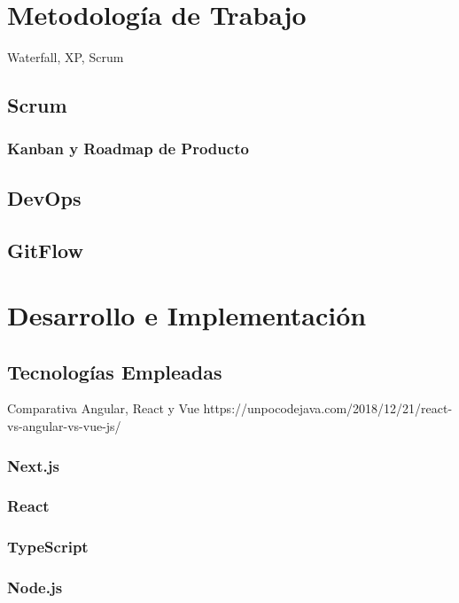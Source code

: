 \documentclass[12pt,twoside,titlepage]{report}
\begin{document}
\section{Metodología de Trabajo}

Waterfall, XP, Scrum

\subsection{Scrum}

\subsubsection{Kanban y Roadmap de Producto}

\subsection{DevOps}

\subsection{GitFlow}

\section{Desarrollo e Implementación}

\subsection{Tecnologías Empleadas}

Comparativa Angular, React y Vue
https://unpocodejava.com/2018/12/21/react-vs-angular-vs-vue-js/

\subsubsection{Next.js}

\subsubsection{React}

\subsubsection{TypeScript}

\subsubsection{Node.js}
\end{document}
